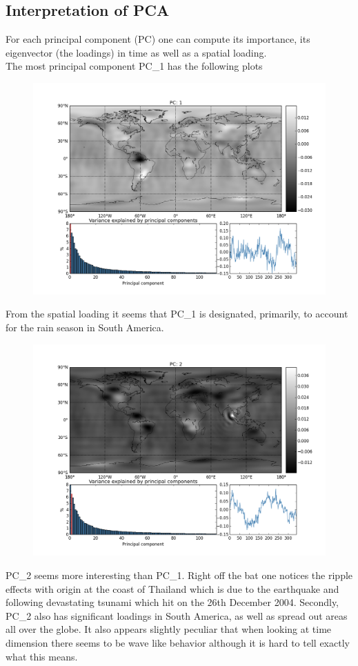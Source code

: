 \subsection{Interpretation of PCA}

For each principal component (PC) one can compute its importance, its eigenvector (the loadings) in time as well as a spatial loading. 
\\
The most principal component PC\_1 has the following plots

\begin{figure}[H]
\centering
\includegraphics[width=1.0\linewidth]{figures/pc_1.png}
\end{figure}
From the spatial loading it seems that PC\_1 is designated, primarily, to account for the rain season in South America. 

\begin{figure}[H]
\centering
\includegraphics[width=1.0\linewidth]{figures/pc_2.png}
\end{figure}
PC\_2 seems more interesting than PC\_1. Right off the bat one notices the ripple effects with origin at the coast of Thailand which is due to the earthquake and following devastating tsunami which hit on the 26th December 2004. Secondly, PC\_2 also has significant loadings in South America, as well as spread out areas all over the globe. It also appears slightly peculiar that when looking at time dimension there seems to be wave like behavior although it is hard to tell exactly what this means.
